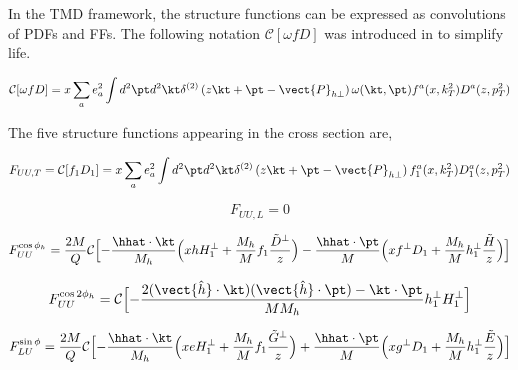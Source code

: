 In the TMD framework, the structure functions can be expressed as convolutions of PDFs and FFs.  The following notation $\mathcal{C}[\omega f D]$ was introduced in \cite{tmds-bacchetta:2006} to simplify life.

\begin{equation}
  \mathcal{C}[\omega f D] = x \sum_{a} e^{2}_{a} \int d^{2}\pt d^{2}\kt \delta^{(2)} \left( z\kt + \pt - \vect{P}_{h\perp} \right) \omega (\kt, \pt) f^{a}(x, k_{T}^{2}) D^{a}(z, p_{T}^{2}) 
\end{equation}

The five structure functions appearing in the cross section are, 

\begin{equation}
F_{UU,T} = \mathcal{C}[f_1 D_1] = x \sum_{a} e^{2}_{a} \int d^{2} \pt d^{2} \kt \delta^{(2)} \left( z\kt + \pt - \vect{P}_{h\perp} \right) f_{1}^{a}(x, k_{T}^{2}) D_{1}^{a}(z, p_{T}^{2})
\end{equation}

\begin{equation}
F_{UU,L} = 0
\end{equation}

\begin{equation}
F_{UU}^{\cos \phi_h} = \frac{2M}{Q} \mathcal{C} \Bigl[ - \frac{\hhat \cdot \kt}{M_h} \Bigl( x h H_{1}^{\perp} + \frac{M_h}{M} f_1 \frac{\tilde{D}^{\perp}}{z} \Bigr) - \frac{\hhat \cdot \pt}{M} \Bigl( x f^{\perp} D_1 + \frac{M_h}{M} h_1^{\perp} \frac{\tilde{H}}{z} \Bigr)\Bigr]
\end{equation}

\begin{equation}
F_{UU}^{\cos 2\phi_h} = \mathcal{C} \Bigl[ - \frac{2 (\vect{\hat{h}} \cdot \kt) (\vect{\hat{h}} \cdot \pt) - \kt \cdot \pt}{M M_h} h_{1}^{\perp} H_{1}^{\perp} \Bigr]
\end{equation}

\begin{equation}
  F_{LU}^{\sin\phi} = \frac{2M}{Q} \mathcal{C} \Bigl[ -\frac{\hhat \cdot \kt}{M_h} \Bigl( xeH_1^\perp + \frac{M_h}{M} f_1 \frac{\tilde{G}^\perp}{z} \Bigr) + \frac{\hhat \cdot \pt}{M} \Bigl( xg^\perp D_1 + \frac{M_h}{M} h_{1}^{\perp} \frac{\tilde{E}}{z} \Bigr) \Bigr]
\end{equation}


